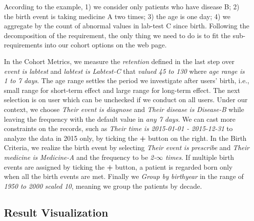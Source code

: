 \documentclass[10pt,conference,letterpaper]{IEEEtran}
\begin{document}
According to the example, 1) we consider only patients who have disease B; 2) the birth event is taking medicine A two times; 3) the age is one day; 4) we aggregate by the count of abnormal values in lab-test C since birth. Following the decomposition of the requirement, the only thing we need to do is to fit the sub-requirements into our cohort options on the web page. 

In the Cohort Metrics, we measure the \emph{retention} defined in the last step over \emph{event is labtest} and \emph{labtest is Labtest-C} that \emph{valued 45 to 130} where \emph{age range is 1 to 7 days}. The age range settles the period we investigate after users' birth, i.e., small range for short-term effect and large range for long-term effect. The next selection is on user which can be unchecked if we conduct on all users. Under our context, we choose \emph{Their event is diagnose} and \emph{Their disease is Disease-B} while leaving the frequency with the default value in \emph{any 7 days}. We can cast more constraints on the records, such as \emph{Their time is 2015-01-01 - 2015-12-31} to analyze the data in 2015 only, by ticking the \textbf{+} button on the right. In the Birth Criteria, we realize the birth event by selecting \emph{Their event is prescribe} and \emph{Their medicine is Medicine-A} and the frequency to be \emph{2-$\infty$ times}. If multiple birth events are assigned by ticking the \textbf{+} button, a patient is regarded born only when all the birth events are met. Finally we \emph{Group by birthyear} in the range of \emph{1950 to 2000 scaled 10}, meaning we group the patients by decade.

\subsection{Result Visualization}
\end{document}
